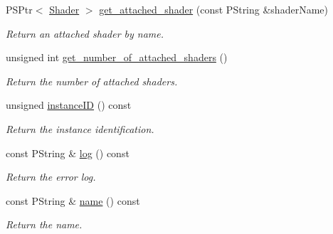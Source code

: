 \begin{DoxyCompactItemize}
P\+S\+Ptr$<$ \mbox{\hyperlink{classprz_1_1_shader}{Shader}} $>$ \mbox{\hyperlink{classprz_1_1_shader___program_a14596994d22a0560b9f48a810dec1bef}{get\+\_\+attached\+\_\+shader}} (const P\+String \&shader\+Name)
\begin{DoxyCompactList}\small\item\em Return an attached shader by name. \end{DoxyCompactList}\item 
unsigned int \mbox{\hyperlink{classprz_1_1_shader___program_a9259f0edb13c9d2dd8b9863c668d0434}{get\+\_\+number\+\_\+of\+\_\+attached\+\_\+shaders}} ()
\begin{DoxyCompactList}\small\item\em Return the number of attached shaders. \end{DoxyCompactList}\item 
unsigned \mbox{\hyperlink{classprz_1_1_shader___program_a55bb714a5fb1c02b5425290ed0f38333}{instance\+ID}} () const
\begin{DoxyCompactList}\small\item\em Return the instance identification. \end{DoxyCompactList}\item 
const P\+String \& \mbox{\hyperlink{classprz_1_1_shader___program_a9370e9d2f79184492113936cdc79ca1f}{log}} () const
\begin{DoxyCompactList}\small\item\em Return the error log. \end{DoxyCompactList}\item 
const P\+String \& \mbox{\hyperlink{classprz_1_1_shader___program_ab6eacdeb0d1733ea9ba6abfa00c34fe8}{name}} () const
\begin{DoxyCompactList}\small\item\em Return the name. \end{DoxyCompactList}\end{DoxyCompactItemize}
